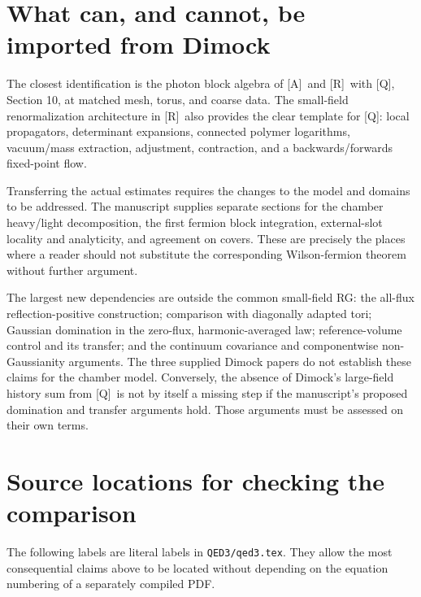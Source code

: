 \documentclass[11pt]{article}
\numberwithin{equation}{section}
\newcommand{\Q}{\textup{[Q]}}
\newcommand{\AG}{\textup{[A]}}
\newcommand{\UR}{\textup{[R]}}
\begin{document}
\section{What can, and cannot, be imported from Dimock}

The closest identification is the photon block algebra of \AG\ and
\UR\ with \Q, Section 10, at matched mesh, torus, and coarse data.
The small-field renormalization architecture in \UR\ also provides
the clear template for \Q: local propagators, determinant expansions,
connected polymer logarithms, vacuum/mass extraction, adjustment,
contraction, and a backwards/forwards fixed-point flow.

Transferring the actual estimates requires the changes to the model
and domains to be addressed. The manuscript supplies separate
sections for the chamber heavy/light decomposition, the first
fermion block integration, external-slot locality and analyticity,
and agreement on covers. These are precisely the places where a
reader should not substitute the corresponding Wilson-fermion
theorem without further argument.

The largest new dependencies are outside the common small-field RG:
the all-flux reflection-positive construction; comparison with
diagonally adapted tori; Gaussian domination in the zero-flux,
harmonic-averaged law; reference-volume control and its transfer;
and the continuum covariance and componentwise non-Gaussianity
arguments. The three supplied Dimock papers do not establish these
claims for the chamber model. Conversely, the absence of Dimock's
large-field history sum from \Q\ is not by itself a missing step if
the manuscript's proposed domination and transfer arguments hold.
Those arguments must be assessed on their own terms.

\section{Source locations for checking the comparison}

The following labels are literal labels in \texttt{QED3/qed3.tex}.
They allow the most consequential claims above to be located without
depending on the equation numbering of a separately compiled PDF.
\end{document}
